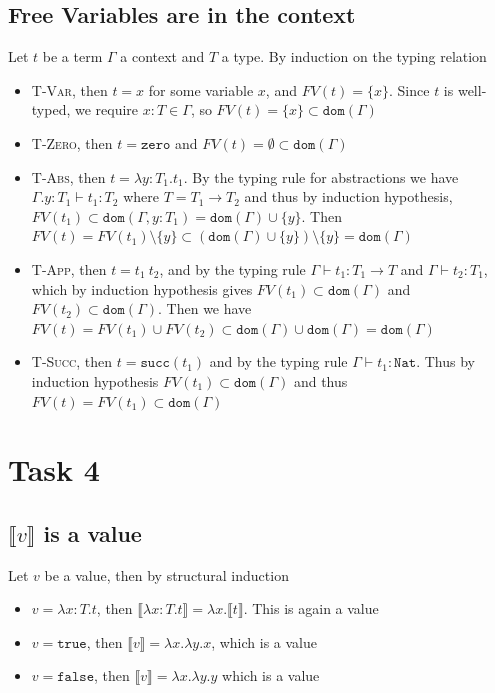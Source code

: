 \documentclass{article}
\begin{document}
\subsection*{Free Variables are in the context}
Let $t$ be a term $\Gamma$ a context and $T$ a type.
By induction on the typing relation
\begin{itemize}
\item \textsc{T-Var}, then $t=x$ for some variable $x$, and $FV(t) = \{x\}$. 
Since $t$ is well-typed, we require $x:T\in\Gamma$, so $FV(t) = \{x\}\subset\mathtt{dom}(\Gamma)$
\item \textsc{T-Zero}, then $t=\mathtt{zero}$ and $FV(t) = \emptyset\subset\mathtt{dom}(\Gamma)$
\item \textsc{T-Abs}, then $t = \lambda y:T_1.t_1$. 
By the typing rule for abstractions we have $\Gamma.y:T_1\vdash t_1:T_2$ where $T = T_1 \rightarrow T_2$ and thus by induction hypothesis, $FV(t_1) \subset \mathtt{dom}(\Gamma,y:T_1) = \mathtt{dom}(\Gamma) \cup \{y\}$.
Then $FV(t) = FV(t_1) \setminus \{y\} \subset (\mathtt{dom}(\Gamma) \cup \{y\})\setminus \{y\} = \mathtt{dom}(\Gamma)$
\item \textsc{T-App}, then $t=t_1\ t_2$, and by the typing rule $\Gamma\vdash t_1:T_1\rightarrow T$ and $\Gamma \vdash t_2:T_1$, which by induction hypothesis gives $FV(t_1)\subset\mathtt{dom}(\Gamma)$ and $FV(t_2)\subset\mathtt{dom}(\Gamma)$.
Then we have $FV(t) = FV(t_1) \cup FV(t_2) \subset \mathtt{dom}(\Gamma) \cup \mathtt{dom}(\Gamma) = \mathtt{dom}(\Gamma)$
\item \textsc{T-Succ}, then $t = \mathtt{succ}(t_1)$ and by the typing rule $\Gamma \vdash t_1:\mathtt{Nat}$.
Thus by induction hypothesis $FV(t_1) \subset \mathtt{dom}(\Gamma)$ and thus $FV(t) = FV(t_1) \subset \mathtt{dom}(\Gamma)$
\end{itemize}

\section*{Task 4}
\subsection*{$\llbracket v\rrbracket$ is a value}
Let $v$ be a value, then by structural induction
\begin{itemize}
\item $v = \lambda x:T.t$, then $\llbracket \lambda x:T.t\rrbracket = \lambda x.\llbracket t\rrbracket$.
This is again a value
\item $v = \mathtt{true}$, then $\llbracket v\rrbracket = \lambda x.\lambda y.x$, which is a value
\item $v = \mathtt{false}$, then $\llbracket v \rrbracket = \lambda x.\lambda y.y$ which is a value
\end{itemize}
\end{document}
